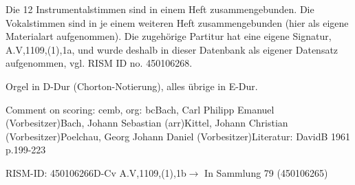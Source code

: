\documentclass[a4paper, twocolumn, 11pt]{book}
\begin{document}
\newline %
\par Die 12 Instrumentalstimmen sind in einem Heft zusammengebunden. Die Vokalstimmen sind in je einem weiteren Heft zusammengebunden (hier als eigene Materialart aufgenommen). Die zugehörige Partitur hat eine eigene Signatur, A.V,1109,(1),1a, und wurde deshalb in dieser Datenbank als eigener Datensatz aufgenommen, vgl. RISM ID no. 450106268.
\par Orgel in D-Dur (Chorton-Notierung), alles übrige in E-Dur.
\par Comment on scoring: cemb, org: bc\newline Bach, Carl Philipp Emanuel  (Vorbesitzer)\newline Bach, Johann Sebastian  (arr)\newline Kittel, Johann Christian  (Vorbesitzer)\newline Poelchau, Georg Johann Daniel  (Vorbesitzer)\newline Literatur: DavidB 1961  p.199-223
\par RISM-ID: 450106266\newline D-Cv  A.V,1109,(1),1b\newline $\rightarrow$ In Sammlung 79 (450106265)
      
\end{document}
